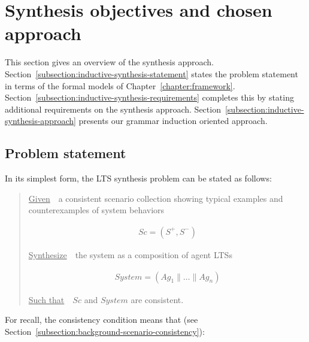 \section{Synthesis objectives and chosen approach\label{section:inductive-overview}}

This section gives an overview of the synthesis approach. Section~\ref{subsection:inductive-synthesis-statement} states the problem statement in terms of the formal models of Chapter~\ref{chapter:framework}. Section~\ref{subsection:inductive-synthesis-requirements} completes this by stating additional requirements on the synthesis approach. Section~\ref{subsection:inductive-synthesis-approach} presents our grammar induction oriented approach.


\subsection{Problem statement\label{subsection:inductive-synthesis-statement}}

In its simplest form, the LTS synthesis problem can be stated as follows:

\begin{quotation}
\noindent \underline{Given}~~a consistent scenario collection showing typical examples and counterexamples of system behaviors

\vspace{-0.7cm}
\begin{align*}
Sc = (S^+,S^-)
\end{align*}

\vspace{-0.2cm}
\noindent \underline{Synthesize}~~the system as a composition of agent LTSs

\vspace{-0.7cm}
\begin{align*}
System = (Ag_1 \parallel \ldots \parallel Ag_n)
\end{align*}

\vspace{-0.2cm}
\noindent \underline{Such that}~~$Sc$ and $System$ are consistent.
\end{quotation}

\noindent For recall, the consistency condition means that (see Section~\ref{subsection:background-scenario-consistency}):

